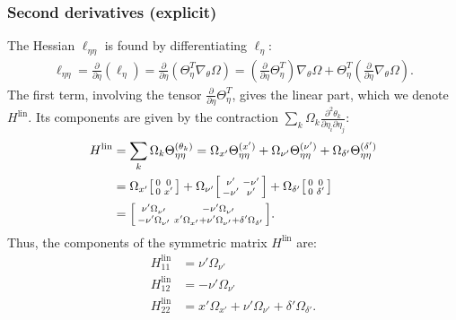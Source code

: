 \documentclass{article}
\begin{document}
\subsubsection{Second derivatives (explicit)}

The Hessian $\ell_{\eta\eta}$ is found by differentiating $\ell_\eta$:
%
\begin{align}
  \ell_{\eta\eta} = \frac{\partial}{\partial \eta} (\ell_\eta) = \frac{\partial}{\partial \eta} (\Theta_\eta^T \nabla_\theta \Omega) = (\frac{\partial}{\partial \eta} \Theta_\eta^T) \nabla_\theta \Omega + \Theta_\eta^T (\frac{\partial}{\partial \eta} \nabla_\theta \Omega).
\end{align}
%
The first term, involving the tensor $\frac{\partial}{\partial \eta} \Theta_\eta^T$, gives the linear part, which we denote $H^{\text{lin}}$.
Its components are given by the contraction $\sum_k \Omega_k \frac{\partial^2 \theta_k}{\partial \eta_i \partial \eta_j}$:
%
\begin{align}
  H^{\text{lin}} & = \sum_k \Omega_k \Theta_{\eta\eta}^{(\theta_k)} = \Omega_{x'} \Theta_{\eta\eta}^{(x')} + \Omega_{\nu'} \Theta_{\eta\eta}^{(\nu')} + \Omega_{\delta'} \Theta_{\eta\eta}^{(\delta')} \\
                 & = \Omega_{x'} \begin{bsmallmatrix} 0 & 0 \\ 0 & x' \end{bsmallmatrix} + \Omega_{\nu'} \begin{bsmallmatrix} \nu' & -\nu' \\ -\nu' & \nu' \end{bsmallmatrix} + \Omega_{\delta'} \begin{bsmallmatrix} 0 & 0 \\ 0 & \delta' \end{bsmallmatrix}                                    \\
                 & = \begin{bsmallmatrix}
    \nu' \Omega_{\nu'} & -\nu' \Omega_{\nu'} \\
    -\nu' \Omega_{\nu'} & x' \Omega_{x'} + \nu' \Omega_{\nu'} + \delta' \Omega_{\delta'}
  \end{bsmallmatrix}.
\end{align}
%
Thus, the components of the symmetric matrix $H^{\text{lin}}$ are:
%
\begin{align}
  H^{\text{lin}}_{11} & = \nu' \Omega_{\nu'}                                              \\
  H^{\text{lin}}_{12} & = -\nu' \Omega_{\nu'}                                             \\
  H^{\text{lin}}_{22} & = x' \Omega_{x'} + \nu' \Omega_{\nu'} + \delta' \Omega_{\delta'}.
\end{align}
\end{document}

